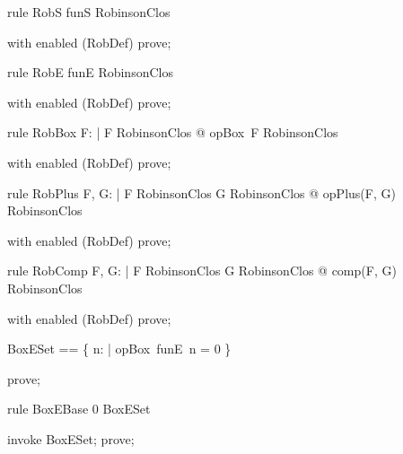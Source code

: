 \documentclass{article}
\begin{document}
\begin{theorem}{rule RobS}
  funS \in RobinsonClos
\end{theorem}

\begin{zproof}
with enabled (RobDef) prove;
\end{zproof}

\begin{theorem}{rule RobE}
  funE \in RobinsonClos
\end{theorem}

\begin{zproof}
with enabled (RobDef) prove;
\end{zproof}

\begin{theorem}{rule RobBox}
  \forall F: \nat \fun \nat | F \in RobinsonClos @ opBox~F \in RobinsonClos
\end{theorem}

\begin{zproof}
with enabled (RobDef) prove;
\end{zproof}

\begin{theorem}{rule RobPlus}
  \forall F, G: \nat \fun \nat | F \in RobinsonClos \land G \in RobinsonClos @ opPlus(F, G) \in RobinsonClos
\end{theorem}

\begin{zproof}
with enabled (RobDef) prove;
\end{zproof}

\begin{theorem}{rule RobComp}
  \forall F, G: \nat \fun \nat | F \in RobinsonClos \land G \in RobinsonClos @ comp(F, G) \in RobinsonClos
\end{theorem}

\begin{zproof}
with enabled (RobDef) prove;
\end{zproof}

\begin{zed}
  BoxESet == \{ n: \nat | opBox~funE~n = 0 \}
\end{zed}

\begin{zproof}
prove;
\end{zproof}

\begin{theorem}{rule BoxEBase}
  0 \in BoxESet
\end{theorem}

\begin{zproof}
invoke BoxESet;
prove;
\end{zproof}
\end{document}
